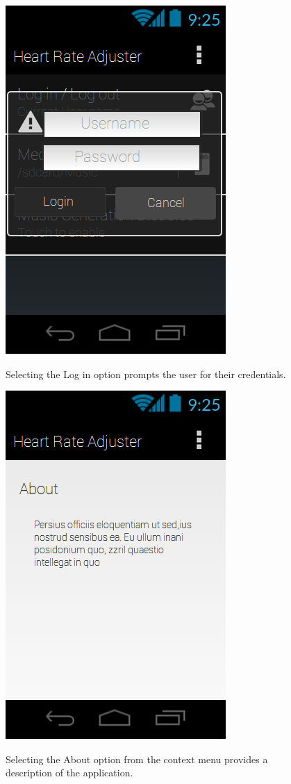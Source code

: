 \documentclass[letterpaper,english, 12pt]{scrreprt}
\begin{document}
\begin{figure}[H]
	\centering
	\includegraphics{img/mobile_ui/5.png}\\
	\caption{Selecting the Log in option prompts the user for their credentials.}
\end{figure}

\begin{figure}[H]
	\centering
	\includegraphics{img/mobile_ui/6.png}\\
	\caption{Selecting the About option from the context menu provides a description of the application.}
\end{figure}
\end{document}
